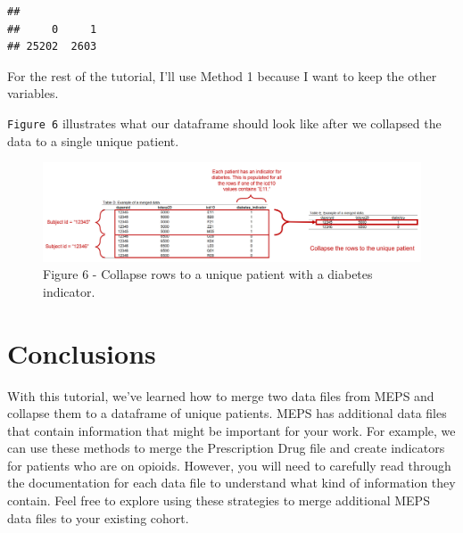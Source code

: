 \documentclass[
]{book}
\newenvironment{Shaded}{\begin{snugshade}}{\end{snugshade}}
\newcommand{\AttributeTok}[1]{\textcolor[rgb]{0.77,0.63,0.00}{#1}}
\newcommand{\DocumentationTok}[1]{\textcolor[rgb]{0.56,0.35,0.01}{\textbf{\textit{#1}}}}
\newcommand{\FunctionTok}[1]{\textcolor[rgb]{0.00,0.00,0.00}{#1}}
\newcommand{\NormalTok}[1]{#1}
\newcommand{\OtherTok}[1]{\textcolor[rgb]{0.56,0.35,0.01}{#1}}
\newcommand{\SpecialCharTok}[1]{\textcolor[rgb]{0.00,0.00,0.00}{#1}}
\begin{document}
\begin{Shaded}
\end{Shaded}

\begin{verbatim}
## 
##     0     1 
## 25202  2603
\end{verbatim}

For the rest of the tutorial, I'll use Method 1 because I want to keep the other variables.

\texttt{Figure\ 6} illustrates what our dataframe should look like after we collapsed the data to a single unique patient.

\begin{figure}
\includegraphics[width=1\linewidth]{Figure 2_6} \caption{Figure 6 - Collapse rows to a unique patient with a diabetes indicator.}\label{fig:unnamed-chunk-22}
\end{figure}

\hypertarget{conclusions-1}{%
\section{Conclusions}\label{conclusions-1}}

With this tutorial, we've learned how to merge two data files from MEPS and collapse them to a dataframe of unique patients. MEPS has additional data files that contain information that might be important for your work. For example, we can use these methods to merge the Prescription Drug file and create indicators for patients who are on opioids. However, you will need to carefully read through the documentation for each data file to understand what kind of information they contain. Feel free to explore using these strategies to merge additional MEPS data files to your existing cohort.
\end{document}
